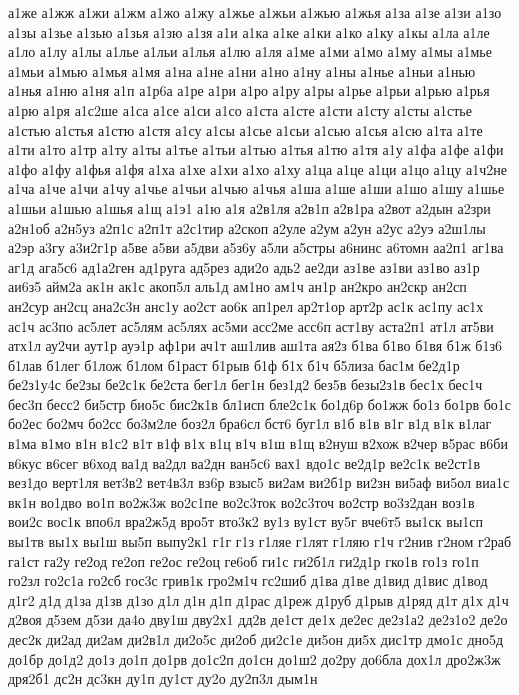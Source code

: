{а1же
а1жж
а1жи
а1жм
а1жо
а1жу
а1жье
а1жьи
а1жью
а1жья
а1за
а1зе
а1зи
а1зо
а1зы
а1зье
а1зью
а1зья
а1зю
а1зя
а1и
а1ка
а1ке
а1ки
а1ко
а1ку
а1кы
а1ла
а1ле
а1ло
а1лу
а1лы
а1лье
а1льи
а1лья
а1лю
а1ля
а1ме
а1ми
а1мо
а1му
а1мы
а1мье
а1мьи
а1мью
а1мья
а1мя
а1на
а1не
а1ни
а1но
а1ну
а1ны
а1нье
а1ньи
а1нью
а1нья
а1ню
а1ня
а1п
а1р6а
а1ре
а1ри
а1ро
а1ру
а1ры
а1рье
а1рьи
а1рью
а1рья
а1рю
а1ря
а1с2ше
а1са
а1се
а1си
а1со
а1ста
а1сте
а1сти
а1сту
а1сты
а1стье
а1стью
а1стья
а1стю
а1стя
а1су
а1сы
а1сье
а1сьи
а1сью
а1сья
а1сю
а1та
а1те
а1ти
а1то
а1тр
а1ту
а1ты
а1тье
а1тьи
а1тью
а1тья
а1тю
а1тя
а1у
а1фа
а1фе
а1фи
а1фо
а1фу
а1фья
а1фя
а1ха
а1хе
а1хи
а1хо
а1ху
а1ца
а1це
а1ци
а1цо
а1цу
а1ч2не
а1ча
а1че
а1чи
а1чу
а1чье
а1чьи
а1чью
а1чья
а1ша
а1ше
а1ши
а1шо
а1шу
а1шье
а1шьи
а1шью
а1шья
а1щ
а1э1
а1ю
а1я
а2в1ля
а2в1п
а2в1ра
а2вот
а2дын
а2зри
а2н1об
а2н5уз
а2п1с
а2п1т
а2с1тир
а2скоп
а2уле
а2ум
а2ун
а2ус
а2уэ
а2ш1лы
а2эр
а3гу
а3и2г1р
а5ве
а5ви
а5дви
а5з6у
а5ли
а5стры
а6нинс
а6томн
аа2п1
аг1ва
аг1д
ага5с6
ад1а2ген
ад1руга
ад5рез
ади2о
адь2
ае2ди
аз1ве
аз1ви
аз1во
аз1р
аи6з5
айм2а
ак1н
ак1с
акоп5л
аль1д
ам1но
ам1ч
ан1р
ан2кро
ан2скр
ан2сп
ан2сур
ан2сц
ана2с3н
анс1у
ао2ст
ао6к
ап1рел
ар2т1ор
арт2р
ас1к
ас1пу
ас1х
ас1ч
ас3по
ас5лет
ас5лям
ас5лях
ас5ми
асс2ме
асс6п
аст1ву
аста2п1
ат1л
ат5ви
атх1л
ау2чи
аут1р
ауэ1р
аф1ри
ач1т
аш1лив
аш1та
ая2з
б1ва
б1во
б1вя
б1ж
б1з6
б1лав
б1лег
б1лож
б1лом
б1раст
б1рыв
б1ф
б1х
б1ч
б5лиза
бас1м
бе2д1р
бе2з1у4с
бе2зы
бе2с1к
бе2ста
бег1л
бег1н
без1д2
без5в
безы2з1в
бес1х
бес1ч
бес3п
бесс2
би5стр
био5с
бис2к1в
бл1исп
бле2с1к
бо1д6р
бо1жж
бо1з
бо1рв
бо1с
бо2ес
бо2мч
бо2сс
бо3м2ле
боз2л
бра6сл
бст6
буг1л
в1б
в1в
в1г
в1д
в1к
в1лаг
в1ма
в1мо
в1н
в1с2
в1т
в1ф
в1х
в1ц
в1ч
в1ш
в1щ
в2нуш
в2хож
в2чер
в5рас
в6би
в6кус
в6сег
в6ход
ва1д
ва2дл
ва2дн
ван5с6
вах1
вдо1с
ве2д1р
ве2с1к
ве2ст1в
вез1до
верт1ля
вет3в2
вет4в3л
вз6р
взыс5
ви2ам
ви2б1р
ви2зн
ви5аф
ви5ол
виа1с
вк1н
во1дво
во1п
во2ж3ж
во2с1пе
во2с3ток
во2с3точ
во2стр
во3з2дан
воз1в
вои2с
вос1к
впо6л
вра2ж5д
вро5т
вто3к2
ву1з
ву1ст
ву5г
вче6т5
вы1ск
вы1сп
вы1тв
вы1х
вы1ш
вы5п
выпу2к1
г1г
г1з
г1ляе
г1лят
г1ляю
г1ч
г2нив
г2ном
г2раб
га1ст
га2у
ге2од
ге2оп
ге2ос
ге2оц
ге6об
ги1с
ги2б1л
ги2д1р
гко1в
го1з
го1п
го2зл
го2с1а
го2сб
гос3с
грив1к
гро2м1ч
гс2шиб
д1ва
д1ве
д1вид
д1вис
д1вод
д1г2
д1д
д1за
д1зв
д1зо
д1л
д1н
д1п
д1рас
д1реж
д1руб
д1рыв
д1ряд
д1т
д1х
д1ч
д2воя
д5зем
д5зи
да4о
дву1ш
дву2х1
дд2в
де1ст
де1х
де2ес
де2з1а2
де2з1о2
де2о
дес2к
ди2ад
ди2ам
ди2в1л
ди2о5с
ди2об
ди2с1е
ди5он
ди5х
дис1тр
дмо1с
дно5д
до1бр
до1д2
до1з
до1п
до1рв
до1с2п
до1сн
до1ш2
до2ру
до6бла
дох1л
дро2ж3ж
дря2б1
дс2н
дс3кн
ду1п
ду1ст
ду2о
ду2п3л
дым1н
}
